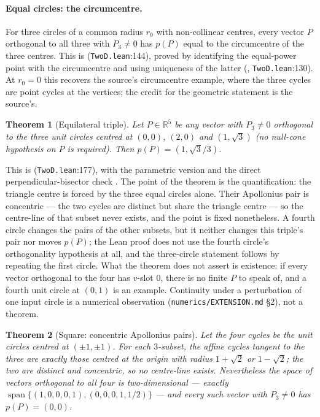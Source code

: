 \documentclass[11pt]{article}
\newtheorem{theorem}{Theorem}
\theoremstyle{definition}
\theoremstyle{remark}
\newcommand{\src}[3]{\texttt{#2}:#3}
\newcommand{\RR}{\mathbb{R}}
\begin{document}
\paragraph{Equal circles: the circumcentre.} For three circles of a common radius $r_0$ with
non-collinear centres, every vector $P$ orthogonal to all three with $P_3\neq0$ has $p(P)$ equal to
the circumcentre of the three centres. This is  (\src{PaperK}{TwoD.lean}{144}), proved by
identifying the equal-power point with the circumcentre and using uniqueness of the latter
(, \src{PaperK}{TwoD.lean}{130}). At $r_0=0$ this recovers
the source's circumcentre example, where the three cycles are point cycles at the vertices; the
credit for the geometric statement is the source's.

\begin{theorem}[Equilateral triple]\label{thm:equilateral}
Let $P\in\RR^5$ be any vector with $P_3\neq0$ orthogonal to the three unit circles centred at
$(0,0)$, $(2,0)$ and $(1,\sqrt3)$ (no null-cone hypothesis on $P$ is required). Then
$p(P)=(1,\sqrt3/3)$.
\end{theorem}

This is  (\src{PaperK}{TwoD.lean}{177}), with the parametric version
 and the direct perpendicular-bisector check
. The point of the theorem is the quantification: the
triangle centre is forced by the three equal circles alone. Their Apollonius pair is concentric ---
the two cycles are distinct but share the triangle centre --- so the centre-line of that subset never
exists, and the point is fixed nonetheless. A fourth circle changes the pairs of the other subsets,
but it neither changes this triple's pair nor moves $p(P)$; the Lean proof does not use the fourth
circle's orthogonality hypothesis at all, and the three-circle statement follows by repeating the
first circle. What the theorem does not assert is existence: if every vector orthogonal to the four has
$v$-slot $0$, there is no finite $P$ to speak of, and a fourth unit circle at $(0,1)$ is an example.
Continuity under a perturbation of one input circle is a numerical observation
(\texttt{numerics/EXTENSION.md} \S2), not a theorem.

\begin{theorem}[Square: concentric Apollonius pairs]\label{thm:square}
Let the four cycles be the unit circles centred at $(\pm1,\pm1)$. For each $3$-subset, the affine
cycles tangent to the three are exactly those centred at the origin with radius $1+\sqrt2$ or
$1-\sqrt2$; the two are distinct and concentric, so no centre-line exists. Nevertheless the space of
\emph{vectors} orthogonal to all four is two-dimensional --- exactly
$\operatorname{span}\{(1,0,0,0,1),(0,0,0,1,1/2)\}$ --- and every such vector with $P_3\neq0$ has
$p(P)=(0,0)$.
\end{theorem}
\end{document}
